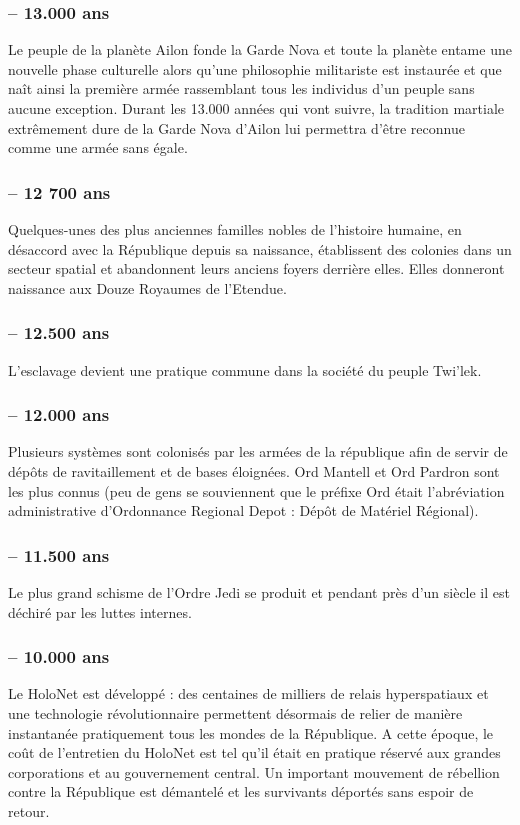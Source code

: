 \documentclass[twoside]{article}
\begin{document}
\subsubsection*{-- 13.000 ans}
Le peuple de la planète Ailon fonde la Garde Nova et toute la planète entame une nouvelle phase culturelle alors qu'une philosophie militariste est instaurée et que na\^{i}t ainsi la première armée rassemblant tous les individus d'un peuple sans aucune exception. Durant les 13.000 années qui vont suivre, la tradition martiale extrêmement dure de la  Garde Nova d'Ailon lui permettra d'être reconnue comme une armée sans égale. 
\subsubsection*{-- 12 700 ans}
Quelques-unes des plus anciennes familles nobles de l'histoire humaine, en désaccord avec la République depuis sa naissance, établissent des colonies dans un secteur spatial et abandonnent leurs anciens foyers derrière elles. Elles donneront naissance aux Douze Royaumes de l'Etendue. 
\subsubsection*{-- 12.500 ans}
L'esclavage devient une pratique commune dans la société du peuple Twi'lek. 
\subsubsection*{-- 12.000 ans}
Plusieurs systèmes sont colonisés par les armées de la république afin de servir de dépôts de ravitaillement et de bases éloignées. Ord Mantell et Ord Pardron sont les plus connus (peu de gens se souviennent que le préfixe Ord était l'abréviation administrative d'Ordonnance Regional Depot : Dépôt de Matériel Régional). 
\subsubsection*{-- 11.500 ans}
Le plus grand schisme de l'Ordre Jedi se produit et pendant près d'un siècle il est déchiré par les luttes internes. 
\subsubsection*{-- 10.000 ans}
Le HoloNet est développé : des centaines de milliers de relais hyperspatiaux et une technologie révolutionnaire permettent désormais de relier de manière instantanée pratiquement tous les mondes de la République. A cette époque, le coût de l'entretien du HoloNet est tel qu'il était en pratique réservé aux grandes corporations et au gouvernement central. 
Un important mouvement de rébellion contre la République est démantelé et les survivants déportés sans espoir de retour. 
\end{document}
